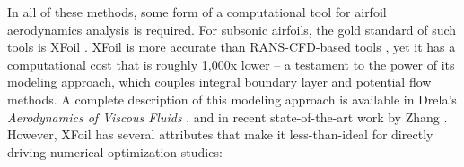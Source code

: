 \documentclass[conf]{new-aiaa}
\begin{document}
    In all of these methods, some form of a computational tool for airfoil aerodynamics analysis is required. For subsonic airfoils, the gold standard of such tools is XFoil \cite{drela_xfoil_1989}. XFoil is more accurate than RANS-CFD-based tools \cite{morgado2016xfoil}, yet it has a computational cost that is roughly 1,000x lower -- a testament to the power of its modeling approach, which couples integral boundary layer and potential flow methods. A complete description of this modeling approach is available in Drela's \textit{Aerodynamics of Viscous Fluids} \cite{drela_aerodynamics_2019}, and in recent state-of-the-art work by Zhang \cite{zhang_threedimensional_2022, zhang_nonparametric_2017}. However, XFoil has several attributes that make it less-than-ideal for directly driving numerical optimization studies:
\end{document}
